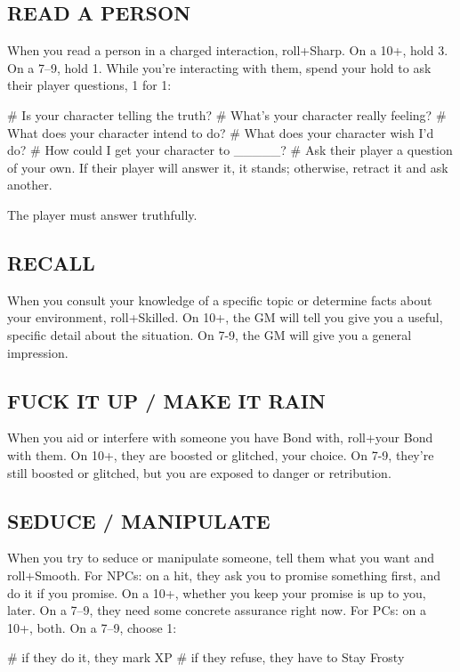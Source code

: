 \subsection{READ A PERSON}
When you read a person in a charged interaction, roll+Sharp. On a 10+, hold 3. On a 7–9, hold 1. While you’re interacting with them, spend your hold to ask their player questions, 1 for 1:

\begin{easylist}
# Is your character telling the truth?
# What’s your character really feeling?
# What does your character intend to do?
# What does your character wish I’d do?
# How could I get your character to \_\_\_\_\_?
# Ask their player a question of your own. If their player will answer it, it stands; otherwise, retract it and ask another.
\end{easylist}

The player must answer truthfully.


\subsection{RECALL}
When you consult your knowledge of a specific topic or determine facts about your environment, roll+Skilled. On 10+, the GM will tell you give you a useful, specific detail about the situation. On 7-9, the GM will give you a general impression.

\subsection{FUCK IT UP / MAKE IT RAIN}
When you aid or interfere with someone you have Bond with, roll+your Bond with them. On 10+, they are boosted or glitched, your choice. On 7-9, they’re still boosted or glitched, but you are exposed to danger or retribution.

\subsection{SEDUCE / MANIPULATE}
When you try to seduce or manipulate someone, tell them what you want and roll+Smooth.
For NPCs: on a hit, they ask you to promise something first, and do it if you promise. On a 10+, whether you keep your promise is up to you, later. On a 7–9, they need some concrete assurance right now.
For PCs: on a 10+, both. On a 7–9, choose 1:

\begin{easylist}
# if they do it, they mark XP
# if they refuse, they have to Stay Frosty    
\end{easylist}


